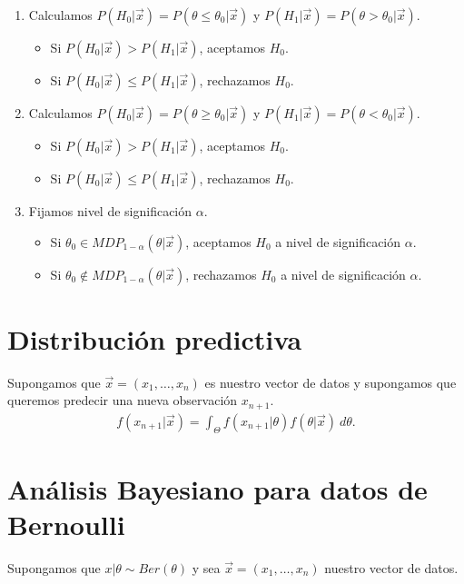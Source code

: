 \begin{enumerate}
    \item Calculamos $P(H_0 | \vec{x}) = P(\theta \leq \theta_0 |\vec{x})$ y $P(H_1 | \vec{x}) = P(\theta > \theta_0 | \vec{x})$.
    \begin{itemize}
        \item Si $P(H_0 | \vec{x}) > P(H_1 | \vec{x})$, aceptamos $H_0$.
        \item Si $P(H_0 | \vec{x}) \leq P(H_1 | \vec{x})$, rechazamos $H_0$.
    \end{itemize}
        \item Calculamos $P(H_0 | \vec{x}) = P(\theta \ge \theta_0 |\vec{x})$ y $P(H_1 | \vec{x}) = P(\theta < \theta_0 | \vec{x})$.
    \begin{itemize}
        \item Si $P(H_0 | \vec{x}) > P(H_1 | \vec{x})$, aceptamos $H_0$.
        \item Si $P(H_0 | \vec{x}) \leq P(H_1 | \vec{x})$, rechazamos $H_0$.
    \end{itemize}
    \item Fijamos nivel de significación $\alpha$.
    \begin{itemize}
        \item Si $\theta_0 \in MDP_{1 - \alpha}(\theta | \vec{x})$, aceptamos $H_0$ a nivel de significación $\alpha$.
        \item Si $\theta_0 \not\in MDP_{1 - \alpha}(\theta | \vec{x})$, rechazamos $H_0$ a nivel de significación $\alpha$.
    \end{itemize}
\end{enumerate}

\section{Distribución predictiva}
\noindent Supongamos que $\vec{x} = (x_1, \ldots, x_n)$ es nuestro vector de datos y supongamos que queremos predecir una nueva observación $x_{n+1}$. 
\begin{align*}
    f(x_{n+1} | \vec{x}) = \int_{\Theta} f(x_{n+1} | \theta) f(\theta | \vec{x}) \ d\theta.
\end{align*}
\begin{ejemplo}
    
\end{ejemplo}

\section{Análisis Bayesiano para datos de Bernoulli}
\noindent Supongamos que $x | \theta \sim Ber(\theta)$ y sea $\vec{x} = (x_1, \ldots, x_n)$ nuestro vector de datos.

